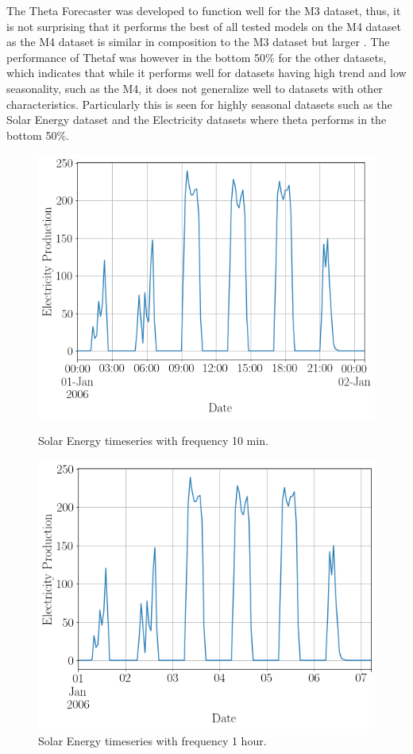 The Theta Forecaster was developed to function well for the M3 dataset, thus, it is not surprising that it performs the best of all tested models on the M4 dataset as the M4 dataset is similar in composition to the M3 dataset but larger \cite{m3_vs_M4}. The performance of Thetaf was however in the bottom 50\% for the other datasets, which indicates that while it performs well for datasets having high trend and low seasonality, such as the M4,  it does not generalize well to datasets with other characteristics. Particularly this is seen for highly seasonal datasets such as the Solar Energy dataset and the Electricity datasets where theta performs in the bottom 50\%.

\begin{figure}[htb]
    \centering
    \includegraphics[width=\linewidth]{./img/solar_energy_10min_small.png}
    \caption{Solar Energy timeseries with frequency 10 min.}
    \label{fig:solar_10_min}
    \endminipage\hfill
    \includegraphics[width=\linewidth]{./img/solar_energy_fixed_small.png}
    \caption{Solar Energy timeseries with frequency 1 hour.}
    \label{fig:solar_fixed}
    \endminipage\hfill
\end{figure}

